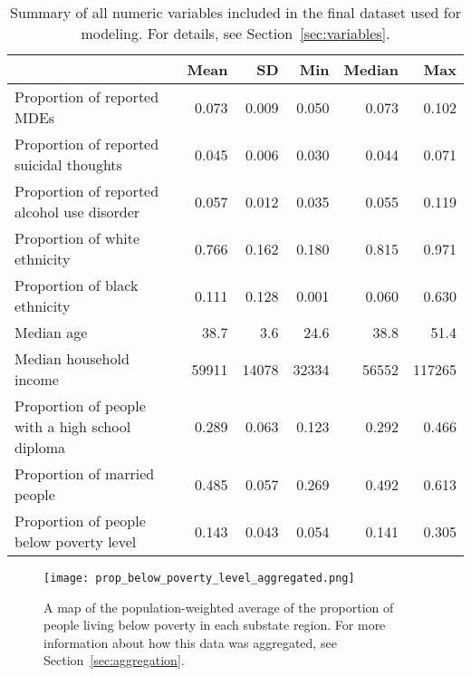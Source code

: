 \documentclass{article}
\begin{document}
\begin{table}[!htb]
\begin{center}
\begin{tabular}{l r r r r r}
    \toprule
    & Mean & SD & Min & Median & Max\\
    \midrule
    Proportion of reported MDEs & 0.073 & 0.009 & 0.050 & 0.073 & 0.102\\
    Proportion of reported suicidal thoughts & 0.045 & 0.006 & 0.030 & 0.044 & 0.071\\
    Proportion of reported alcohol use disorder & 0.057 & 0.012 & 0.035 & 0.055 & 0.119\\
    Proportion of white ethnicity & 0.766 & 0.162 & 0.180 & 0.815 & 0.971\\
    Proportion of black ethnicity & 0.111 & 0.128 & 0.001 & 0.060 & 0.630\\
    Median age & 38.7 & 3.6 & 24.6 & 38.8 & 51.4\\
    Median household income & 59911 & 14078 & 32334 & 56552 & 117265\\
    Proportion of people with a high school diploma & 0.289 & 0.063 & 0.123 & 0.292 & 0.466\\
    Proportion of married people & 0.485 & 0.057 & 0.269 & 0.492 & 0.613\\
    Proportion of people below poverty level & 0.143 & 0.043 & 0.054 & 0.141 & 0.305\\
    \bottomrule
\end{tabular}
\end{center}
\caption{\label{tab:summary}
Summary of
all numeric variables included in the final dataset used for modeling.
For details, see Section~\ref{sec:variables}.}
\end{table}


\begin{figure}[!htb]
    \centering
    \texttt{[image: prop\_below\_poverty\_level\_aggregated.png]}
    \caption{A map of the population-weighted average of the proportion of
    people living below poverty in each substate region.
	For more information about how this data was aggregated,
	see Section~\ref{sec:aggregation}.
	}
    \label{fig:map-poverty}
\end{figure}
\end{document}
